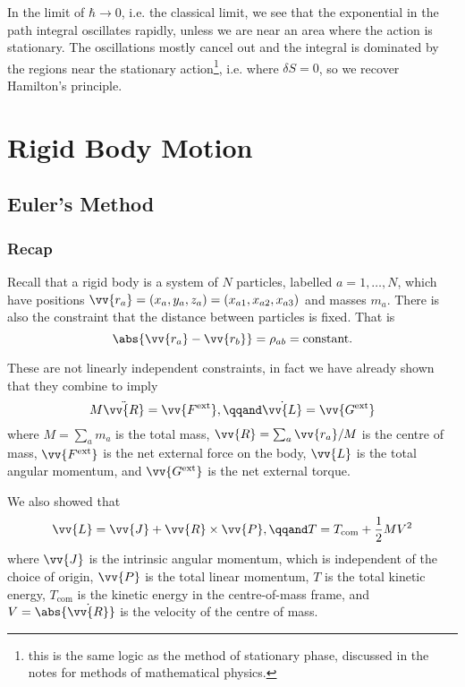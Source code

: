 \documentclass[fleqn]{NotesClass}
\newcommand*{\ext}{\mathrm{ext}}
\begin{document}
    In the limit of \(\hbar \to 0\), i.e. the classical limit, we see that the exponential in the path integral oscillates rapidly, unless we are near an area where the action is stationary.
    The oscillations mostly cancel out and the integral is dominated by the regions near the stationary action\footnote{this is the same logic as the method of stationary phase, discussed in the notes for methods of mathematical physics.}, i.e. where \(\delta S = 0\), so we recover Hamilton's principle.
    
    \part{Rigid Body Motion}
    \chapter{Euler's Method}
    \section{Recap}
    Recall that a rigid body is a system of \(N\) particles, labelled \(a = 1, \dotsc, N\), which have positions \(\vv{r_a} = (x_a, y_a, z_a) = (x_{a1}, x_{a2}, x_{a3})\) and masses \(m_a\).
    There is also the constraint that the distance between particles is fixed.
    That is
    \begin{equation}
        \abs{\vv{r_a} - \vv{r_b}} = \rho_{ab} = \text{constant}.
    \end{equation}
    
    These are not linearly independent constraints, in fact we have already shown that they combine to imply
    \begin{equation}
        M \ddot{\vv{R}} = \vv{F^{\ext}}, \qqand \dot{\vv{L}} = \vv{G^{\ext}}
    \end{equation}
    where \(M = \sum_a m_a\)  is the total mass, \(\vv{R} = \sum_a \vv{r_a}/M\) is the centre of mass, \(\vv{F^{\ext}}\) is the net external force on the body, \(\vv{L}\) is the total angular momentum, and \(\vv{G^{\ext}}\) is the net external torque.
    
    We also showed that
    \begin{equation}
        \vv{L} = \vv{J} + \vv{R} \times \vv{P}, \qqand T = T_{\mathrm{com}} + \frac{1}{2}MV^2
    \end{equation}
    where \(\vv{J}\) is the intrinsic angular momentum, which is independent of the choice of origin, \(\vv{P}\) is the total linear momentum, \(T\) is the total kinetic energy, \(T_{\mathrm{com}}\) is the kinetic energy in the centre-of-mass frame, and \(V = \abs{\dot{\vv{R}}}\) is the velocity of the centre of mass.
    
\end{document}

